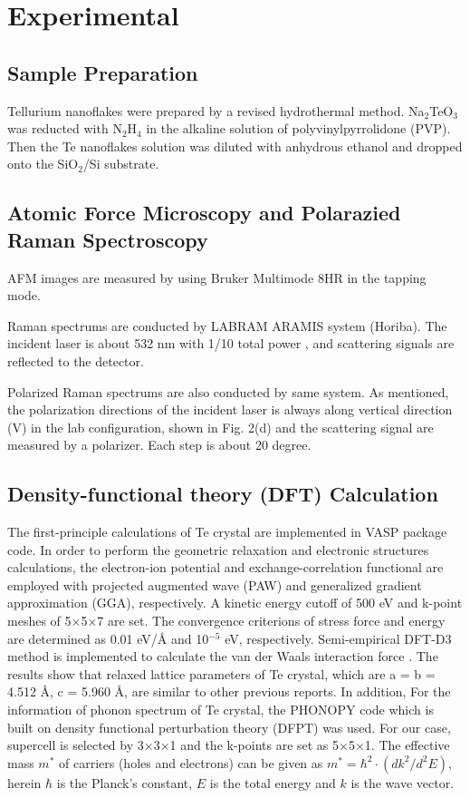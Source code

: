 \documentclass[journal=jacsat,manuscript=article]{achemso}
\begin{document}
\section{Experimental}

\subsection{Sample Preparation}
Tellurium nanoflakes were prepared by a revised hydrothermal method. Na$_2$TeO$_3$ was reducted with N$_2$H$_4$ in the alkaline solution of polyvinylpyrrolidone (PVP). Then the Te nanoflakes solution was diluted with anhydrous ethanol and dropped onto the SiO$_2$/Si substrate. 

\subsection{Atomic Force Microscopy and Polarazied Raman Spectroscopy}
AFM images are measured by using Bruker Multimode 8HR in the tapping mode.

Raman spectrums are conducted by LABRAM ARAMIS system (Horiba). The incident laser is about 532 nm with 1/10 total power , and scattering signals are reflected to the detector.

Polarized Raman spectrums are also conducted by same system. As mentioned, the polarization directions of the incident laser is always along vertical direction (V) in the lab configuration, shown in Fig. 2(d) and the scattering signal are measured by a polarizer. Each step is about 20 degree.

\subsection{Density-functional theory (DFT) Calculation}
The first-principle calculations of Te crystal are implemented in VASP package code. In order to perform the geometric relaxation and electronic structures calculations, the electron-ion potential and exchange-correlation functional are employed with projected augmented wave (PAW) and generalized gradient approximation (GGA)\cite{perdew1996generalized}, respectively. A kinetic energy cutoff of 500 eV and k-point meshes of 5×5×7 are set. The convergence criterions of stress force and energy are determined as 0.01 eV/Å and 10$^{-5}$ eV, respectively. Semi-empirical DFT-D3 method is implemented to calculate the van der Waals interaction force \cite{grimme2006semiempirical,kerber2008application}. The results show that relaxed lattice parameters of Te crystal, which are a = b = 4.512 Å, c = 5.960 Å, are similar to other previous reports\cite{kresse1994theory,cheng2019large}. In addition, For the information of phonon spectrum of Te crystal\cite{gonze1994interatomic,giannozzi1991ab}, the PHONOPY code which is built on density functional perturbation theory (DFPT)\cite{gonze1997dynamical} was used. For our case, supercell is selected by 3×3×1 and the  k-points are set as 5×5×1. The effective mass $m^*$ of carriers (holes and electrons) can be given as $m^{*}={\hbar}^2\cdot (dk^2/d^2 E)$, herein $\hbar$ is the Planck’s constant, $E$ is the total energy and $k$ is the wave vector\cite{neamensemiconductor}.
\end{document}
